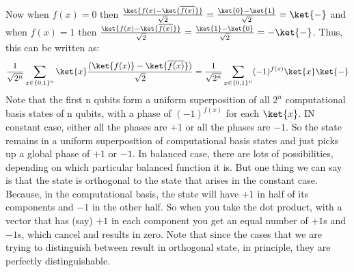 \documentclass[12pt, oneside]{book}
\theoremstyle{definition}
\theoremstyle{definition}
\theoremstyle{remark}
\begin{document}
Now when $f(x)=0$ then $\frac{\ket{f(x)-\ket{\overline{f(x)}}}}{\sqrt{2}}=\frac{\ket{0}-\ket{1}}{\sqrt{2}}=\ket{-}$ and when $f(x)=1$ then $\frac{\ket{f(x)-\ket{\overline{f(x)}}}}{\sqrt{2}}=\frac{\ket{1}-\ket{0}}{\sqrt{2}}=-\ket{-}$.
Thus, this can be written as: 
\[
    \frac{1}{\sqrt{2^n}}\sum_{x \in \{0,1\}^n}\ket{x}\frac{(\ket{f(x)}-\ket{\overline{f(x)}})}{\sqrt{2}}=\frac{1}{\sqrt{2^n}}\sum_{x \in \{0,1\}^n}(-1)^{f(x)}\ket{x}\ket{-}
\]
Note that the first n qubits form a uniform superposition of all $2^n$ computational basis states of n qubits, with a phase of $(-1)^{f(x)}$ for each $\ket{x}$. IN constant case, either all the phases are $+1$ or all the phases are $-1$. So the state remains in a uniform superposition of computational basis states and just picks up a global phase of $+1$ or $-1$. In balanced case, there are lots of possibilities, depending on which particular balanced function it is. But one thing we can say is that the state is orthogonal to the state that arises in the constant case. Because, in the computational basis, the state will have $+1$ in half of its components and $-1$ in the other half. So when you take the dot product, with a vector that has (say) $+1$ in each component you get an equal number of $+1$s and $-1$s, which cancel and results in zero. Note that since the cases that we are trying to distinguish between result in orthogonal state, in principle, they are perfectly distinguishable. 
\end{document}

